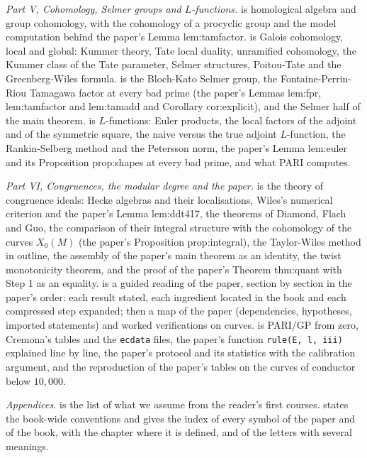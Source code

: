 \emph{Part V, Cohomology, Selmer groups and $L$-functions.}  is homological
algebra and group cohomology, with the cohomology of a procyclic group and the model computation
behind the paper's Lemma lem:tamfactor.  is Galois cohomology, local and global:
Kummer theory, Tate local duality, unramified cohomology, the Kummer class of the Tate parameter,
Selmer structures, Poitou-Tate and the Greenberg-Wiles formula.  is the
Bloch-Kato Selmer group, the Fontaine-Perrin-Riou Tamagawa factor at every bad prime (the paper's
Lemmas lem:fpr, lem:tamfactor and lem:tamadd and Corollary cor:explicit), and the Selmer half of
the main theorem.  is $L$-functions: Euler products, the local factors of the
adjoint and of the symmetric square, the naive versus the true adjoint $L$-function, the
Rankin-Selberg method and the Petersson norm, the paper's Lemma lem:euler and its Proposition
prop:shapes at every bad prime, and what PARI computes.

\emph{Part VI, Congruences, the modular degree and the paper.}  is the theory
of congruence ideals: Hecke algebras and their localisations, Wiles's numerical criterion and the
paper's Lemma lem:ddt417, the theorems of Diamond, Flach and Guo, the comparison of their
integral structure with the cohomology of the curves $X_0(M)$ (the paper's Proposition prop:integral), the
Taylor-Wiles method in outline, the assembly of the paper's main theorem as an identity, the twist monotonicity theorem,
and the proof of the paper's Theorem thm:quant with Step 1 as an equality.  is a
guided reading of the paper, section by section in the paper's order: each result stated, each
ingredient located in the book and each compressed step expanded; then a map of the paper
(dependencies, hypotheses, imported statements) and worked verifications on curves.  is PARI/GP from zero, Cremona's tables
and the \texttt{ecdata} files, the paper's function \texttt{rule(E, l, iii)} explained line by
line, the paper's protocol and its statistics with the calibration argument, and the reproduction
of the paper's tables on the curves of conductor below $10{,}000$.

\emph{Appendices.}  is the list of what we assume from the reader's first courses.
 states the book-wide conventions and gives the index of every symbol of the
paper and of the book, with the chapter where it is defined, and of the letters with several
meanings.

